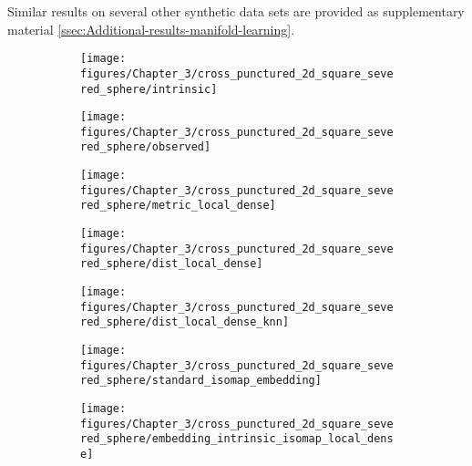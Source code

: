 	Similar results on several other synthetic data sets are provided as supplementary material \cref{ssec:Additional-results-manifold-learning}.
	
	\begin{figure}[h]	
		\begin{centering}
			\begin{subfigure}[b]{0.3\linewidth}
				\texttt{[image: figures/Chapter\_3/cross\_punctured\_2d\_square\_severed\_sphere/intrinsic]}
				\caption{\label{fig:punctured_severed_sphere_intrinsic}}
			\end{subfigure}\hfill
			\begin{subfigure}[b]{0.3\linewidth}
				\texttt{[image: figures/Chapter\_3/cross\_punctured\_2d\_square\_severed\_sphere/observed]}
				\caption{\label{fig:punctured_severed_sphere_observed}}
			\end{subfigure}\hfill
			\begin{subfigure}[b]{0.3\linewidth}
				\texttt{[image: figures/Chapter\_3/cross\_punctured\_2d\_square\_severed\_sphere/metric\_local\_dense]}
				\caption{\label{fig:punctured_severed_sphere_intrinsic_metric}}
			\end{subfigure}
		\end{centering}
		\begin{centering}
			\begin{subfigure}[b]{0.45\linewidth}
				\texttt{[image: figures/Chapter\_3/cross\_punctured\_2d\_square\_severed\_sphere/dist\_local\_dense]}
				\caption{\label{fig:punctured_severed_sphere_intrinsic_dist_est}}
			\end{subfigure}
			\hfill
			\begin{subfigure}[b]{0.45\linewidth}
				\texttt{[image: figures/Chapter\_3/cross\_punctured\_2d\_square\_severed\_sphere/dist\_local\_dense\_knn]}
				\caption{\label{fig:punctured_severed_sphere_intrinsic_dist_est_knn}}
			\end{subfigure}
		\end{centering}
		\begin{centering}
			\begin{subfigure}[b]{0.32\linewidth}
				\texttt{[image: figures/Chapter\_3/cross\_punctured\_2d\_square\_severed\_sphere/standard\_isomap\_embedding]}
				\caption{\label{fig:punctured_severed_sphere_standard_isomap_embedding}}
			\end{subfigure} \hfill
			\begin{subfigure}[b]{0.32\linewidth}
				\texttt{[image: figures/Chapter\_3/cross\_punctured\_2d\_square\_severed\_sphere/embedding\_intrinsic\_isomap\_local\_dense]}

\end{subfigure}
\end{centering}
\end{figure}
